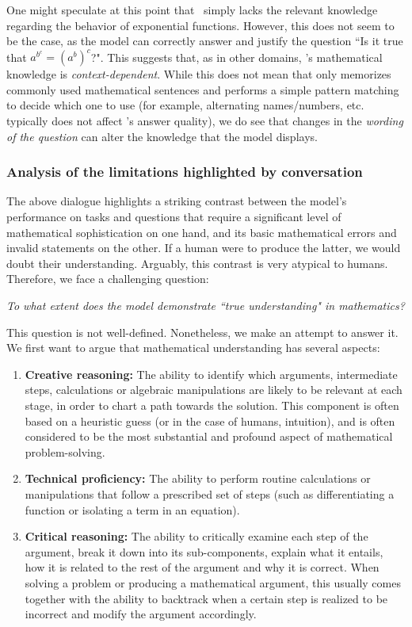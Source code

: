 \vspace{2mm}
 One might speculate at this point that \DV \ simply lacks the relevant knowledge regarding the behavior of exponential functions. However, this does not seem to be the case, as the model can correctly answer and justify the question ``Is it true that $a^{b^c} = (a^b)^c$?". This suggests that, as in other domains, \DV's mathematical knowledge is \textit{context-dependent}. While this does not mean that {\DV} only memorizes commonly used mathematical sentences and performs a simple pattern matching to decide which one to use (for example, alternating names/numbers, etc. typically does not affect {\DV}'s answer quality), we do see that changes in the \emph{wording of the question} can alter the knowledge that the model displays.

\subsubsection{Analysis of the limitations highlighted by conversation}
The above dialogue highlights a striking contrast between the model's performance on tasks and questions that require a significant level of mathematical sophistication on one hand, and its basic mathematical errors and invalid statements on the other. If a human were to produce the latter, we would doubt their understanding. Arguably, this contrast is very atypical to humans. Therefore, we face a challenging question:
\begin{center}
\emph{To what extent does the model demonstrate ``true understanding" in mathematics?}
\end{center}
This question is not well-defined. Nonetheless, we make an attempt to answer it. We first want to argue that mathematical understanding has several aspects:
\begin{enumerate}
\item 
\textbf{Creative reasoning:} 
The ability to identify which arguments, intermediate steps, calculations or algebraic manipulations are likely to be relevant at each stage, in order to chart a path towards the solution. This component is often based on a heuristic guess (or in the case of humans, intuition), and is often considered to be the most substantial and profound aspect of mathematical problem-solving.
\item
\textbf{Technical proficiency:} The ability to perform routine calculations or manipulations that follow a prescribed set of steps (such as differentiating a function or isolating a term in an equation).
\item
\textbf{Critical reasoning:} The ability to critically examine each step of the argument, break it down into its sub-components, explain what it entails, how it is related to the rest of the argument and why it is correct. When solving a problem or producing a mathematical argument, this usually comes together with the ability to backtrack when a certain step is realized to be incorrect and modify the argument accordingly.
\end{enumerate}

